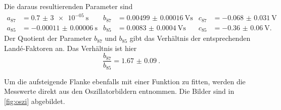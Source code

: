 Die daraus resultierenden Parameter sind
\begin{align*}
    a_\text{87} &= \qty{0.7(30)e-05}{\second} & b_{87} &= \qty{0.00499(16)}{\volt\second} &  c_{87} &= \qty{-0.068(31)}{\volt}\\
    a_\text{85} &= \qty{-0.00011(6)}{\second} & b_{85} &= \qty{0.0083(4)}{\volt\second} &  c_{85} &= \qty{-0.36(6)}{\volt}.
\end{align*}
Der Quotient der Parameter $b_{87}$ und $b_{85}$ gibt das Verhältnis der entsprechenden Landé-Faktoren an.
Das Verhältnis ist hier
\begin{equation*}
    \frac{b_{87}}{b_{85}} = \qty{1.67(9)}{}.
\end{equation*}

Um die aufsteigende Flanke ebenfalls mit einer Funktion zu fitten, werden die Messwerte direkt aus den Oszillatorbildern entnommen.
Die Bilder sind in \autoref{fig:oszi} abgebildet.
